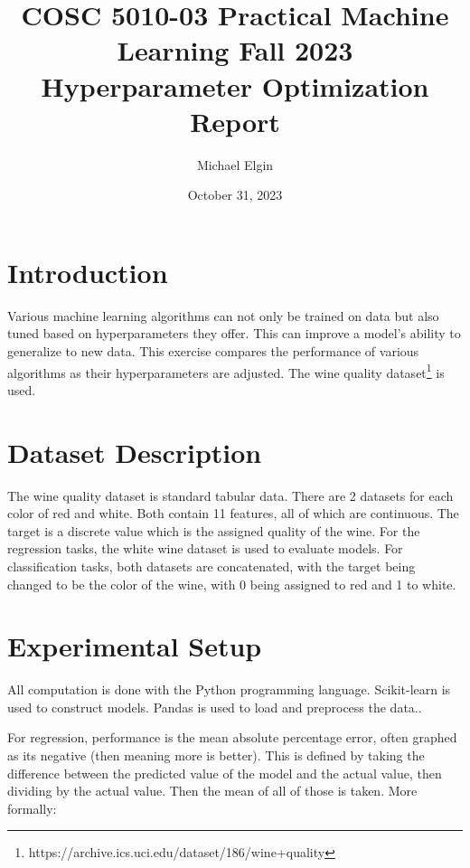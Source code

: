 \documentclass[12pt, letterpaper]{article}
\title{COSC 5010-03 Practical Machine Learning Fall 2023 Hyperparameter Optimization Report}
\author{Michael Elgin}
\date{October 31, 2023}
\begin{document}
\maketitle

\section{Introduction} %

Various machine learning algorithms can not only be trained on data but also tuned based on hyperparameters they offer. This can improve a model's ability to generalize to new data. This exercise compares the performance of various algorithms as their hyperparameters are adjusted. The wine quality dataset\footnote{https://archive.ics.uci.edu/dataset/186/wine+quality} is used.

\section{Dataset Description} %

The wine quality dataset is standard tabular data. There are 2 datasets for each color of red and white. Both contain 11 features, all of which are continuous. The target is a discrete value which is the assigned quality of the wine. For the regression tasks, the white wine dataset is used to evaluate models. For classification tasks, both datasets are concatenated, with the target being changed to be the color of the wine, with 0 being assigned to red and 1 to white.

\section{Experimental Setup} %

All computation is done with the Python programming language. Scikit-learn is used to construct models. Pandas is used to load and preprocess the data..

For regression, performance is the mean absolute percentage error, often graphed as its negative (then meaning more is better). This is defined by taking the difference between the predicted value of the model and the actual value, then dividing by the actual value. Then the mean of all of those is taken. More formally:
\end{document}
